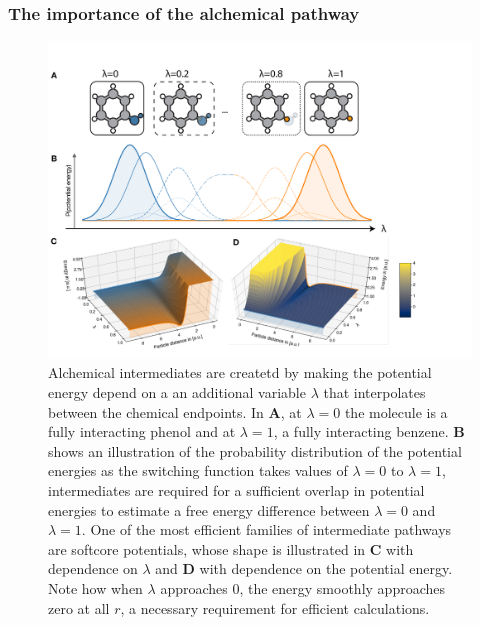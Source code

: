 \documentclass[9pt,bestpractices]{livecoms}
\begin{document}
\subsubsection{The importance of the alchemical pathway\label{sec:important_path}}

\begin{figure}
    \includegraphics[width=0.95\linewidth]{figures/fig7_what_is_lam/Figure.pdf}
    \caption{Alchemical intermediates are createtd by making the potential energy depend on a an additional variable $\lambda$ that interpolates between the chemical endpoints. In \textbf{A}, at $\lambda=0$ the molecule is a fully interacting phenol and at $\lambda=1$,  a fully interacting benzene.  \textbf{B} shows an illustration of the probability distribution of the potential energies as the switching function takes values of $\lambda=0$ to $\lambda=1$, intermediates are required for a sufficient overlap in potential energies to estimate a free energy difference between $\lambda=0$ and $\lambda=1$.
    One of the most efficient families of intermediate pathways  are softcore potentials, whose shape is illustrated in \textbf{C} with dependence on $\lambda$ and \textbf{D} with dependence on the potential energy. Note how when $\lambda$ approaches 0, the energy smoothly approaches zero at all $r$, a necessary requirement for efficient calculations.  }
    \label{fig:fig_what_is_lambda}
\end{figure}
\end{document}
